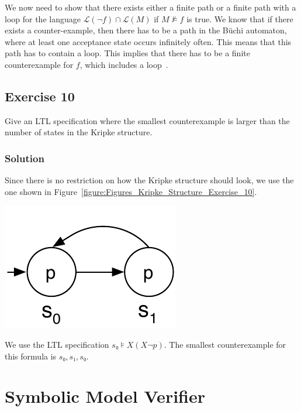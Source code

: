 \documentclass[a4paper, 12pt]{article}
\begin{document}
We now need to show that there exists either a finite path or a finite path
with a loop for the language $ℒ(¬f) ∩ ℒ(M)$ if $M⊭f$ is true. We know that if
there exists a counter-example, then there has to be a path in the Büchi
automaton, where at least one acceptance state occurs infinitely often. This
means that this path has to contain a loop. This implies that there has to be
a finite counterexample for $f$, which includes a
loop~\cite{Norrish2010TemporalLogic}.

\subsection{Exercise 10}

Give an LTL specification where the smallest counterexample is larger than the
number of states in the Kripke structure.

\subsubsection{Solution}

Since there is no restriction on how the Kripke structure should look, we use
the one shown in Figure~\ref{figure:Figures_Kripke_Structure_Exercise_10}.

\begin{minipage}[t]{0.45\textwidth}
    \centering
    \includegraphics[width=.6\textwidth]
        {Figures/Kripke Structure Exercise 10.pdf}
    \label{figure:Figures_Kripke_Structure_Exercise_10}
\end{minipage}
\begin{minipage}[t]{0.45\textwidth}
    \vskip 1cm
    We use the LTL specification $s₀⊧X(X¬p)$. The smallest counterexample for
    this formula is $s₀, s₁, s₀$.
\end{minipage}

\section{Symbolic Model Verifier}
\end{document}
